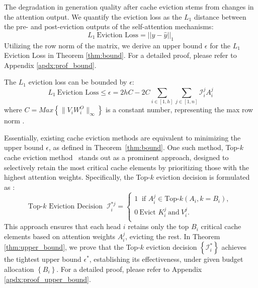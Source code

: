 The degradation in generation quality after cache eviction stems from changes in the attention output. We quantify the eviction loss as the $L_1$ distance between the pre- and post-eviction outputs of the self-attention mechanisms:
\begin{equation}
	L_1 \: \text{Eviction Loss} = ||y-\hat{y}||_1
\end{equation}
Utilizing the row norm of the matrix, we derive an upper bound $\epsilon$ for the $L_1$ Eviction Loss in Theorem \ref{thm:bound}. For a detailed proof, please refer to Appendix \ref{apdx:prof_bound}.
\begin{theorem}
	\label{thm:bound}
	  The $L_1$ eviction loss  can be bounded by $\epsilon$:
	{\small
	\begin{equation}
	L_1 \: \text{Eviction Loss} \leq \epsilon = 2hC - 2C\sum_{i\in [1, h]}\sum_{j \in [1,n ]} \mathcal{I}_i^jA_i^j
	\end{equation}	
	}
	where $C=Max\left\{\lVert V_iW_i^O\rVert_{\infty} \right\}$ is a constant number, representing the max row norm .
		\vspace{-0.2cm}
\end{theorem}



Essentially, existing cache eviction methods are equivalent to minimizing the upper bound $\epsilon$, as defined in Theorem~\ref{thm:bound}. One such method, Top-$k$ cache eviction method~\cite{H2o,SnapKV,PyramidInfer,PyramidKV} stands out as a prominent approach, designed to selectively retain the most critical cache elements by  prioritizing those with the highest attention weights. Specifically, the Top-$k$ eviction decision is formulated as :
	\begin{equation*}
		\text{Top-$k$ Eviction Decision } \:
		\mathcal{I}_i^{*j}  =
		\begin{cases}
			1 	\:	  \text{ if $A_i^j \in \text{Top-$k$}(A_i, k= B_i)$,   }\\
			0 \: \text{Evict  $K_i^j \: \text{and} \: V_i^j$}.\\
		\end{cases}
	\end{equation*}
{
This approach ensures that each head $i$ retains only the top $B_i$ critical cache elements based on attention weights $A_i^j$, evicting the rest. In Theorem \ref{thm:upper_bound}, we prove that the Top-$k$ eviction decision $\left\{ \mathcal{I}^*_i \right\}$ achieves the tightest upper bound $\epsilon^*$, establishing its effectiveness, under given budget allocation $\left\{B_i\right\}$. For a detailed proof, please refer to Appendix \ref{apdx:proof_upper_bound}.
}


